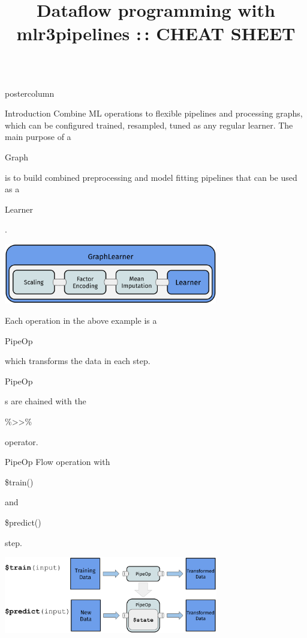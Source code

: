 \documentclass{beamer}
\title{Dataflow programming with mlr3pipelines :\,: CHEAT SHEET} %
\newlength{\columnheight} %
\newcommand{\codeinline}[1]{\begin{codeboxinline}#1\end{codeboxinline}}
\begin{document}
\begin{frame}[fragile]{}
  \begin{columns}
    \begin{column}{.245\textwidth}
      \begin{beamercolorbox}[center]{postercolumn}
        \begin{minipage}{.98\textwidth}
          \parbox[t][\columnheight]{\textwidth}{
            \begin{myblock}{Introduction}
              Combine ML operations to flexible pipelines and processing graphs, which can be configured trained, resampled, tuned as any regular learner.
              The main purpose of a \codeinline{Graph} is to build combined preprocessing and model fitting pipelines that can be used as a \codeinline{Learner}.
              \begin{center}
                \includegraphics[width=0.7\textwidth]{img/grl_linear.pdf}
              \end{center}
              Each operation in the above example is a \codeinline{PipeOp} which transforms the data in each step. \codeinline{PipeOp}s are chained with the \codeinline{\%>{}>\%} operator.
            \end{myblock}
            \vspace{-1.0em}
            \begin{myblock}{PipeOp}
              \vspace{-1.0em}
              Flow operation with \codeinline{\$train()} and \codeinline{\$predict()} step.
              \begin{center}
                \includegraphics[width=0.7\textwidth]{img/po.pdf}

\end{center}
\end{myblock}}
\end{minipage}
\end{beamercolorbox}
\end{column}
\end{columns}
\end{frame}
\end{document}
